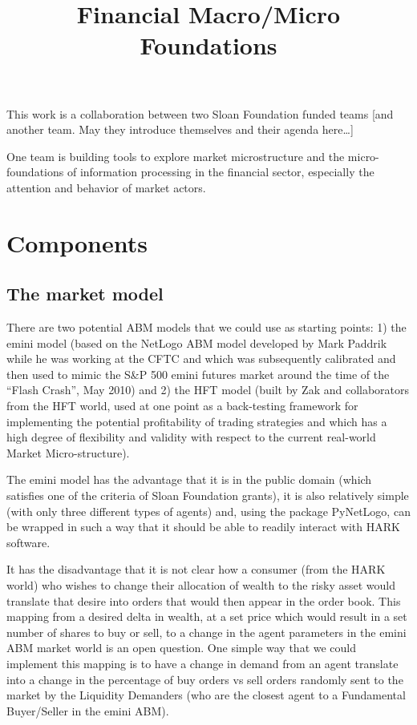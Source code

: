 \title{Financial Macro/Micro Foundations}

This work is a collaboration between two Sloan Foundation funded teams
[and another team. May they introduce themselves and their agenda here…]

One team is building tools to explore market microstructure and the
micro-foundations of information processing in the financial sector,
especially the attention and behavior of market actors.

\section{Components}

\subsection{The market model}

There are two potential ABM models that we could use as starting points:
1) the emini model (based on the NetLogo ABM model developed by Mark Paddrik
while he was working at the CFTC and which was subsequently calibrated and
then used to mimic the S&P 500 emini futures market around the time of the
“Flash Crash”, May 2010) and 2) the HFT model (built by Zak and collaborators
from the HFT world, used at one point as a back-testing framework for
implementing the potential profitability of trading strategies and which has
a high degree of flexibility and validity with respect to the current
real-world Market Micro-structure).

The emini model has the advantage that it is in the public domain (which
satisfies one of the criteria of Sloan Foundation grants), it is also
relatively simple (with only three different types of agents) and,
using the package PyNetLogo, can be wrapped in such a way that it
should be able to readily interact with HARK software. 

It has the disadvantage that it is not clear how a consumer (from the
HARK world) who wishes to change their allocation of wealth to the risky
asset would translate that desire into orders that would then appear
in the order book. This mapping from a desired delta in wealth, at
a set price which would result in a set number of shares to buy or sell,
to a change in the agent parameters in the emini ABM market world is
an open question. One simple way that we could implement this mapping
is to have a change in demand from an agent translate into a change
in the percentage of buy orders vs sell orders randomly sent to the
market by the Liquidity Demanders (who are the closest agent to a
Fundamental Buyer/Seller in the emini ABM). 

